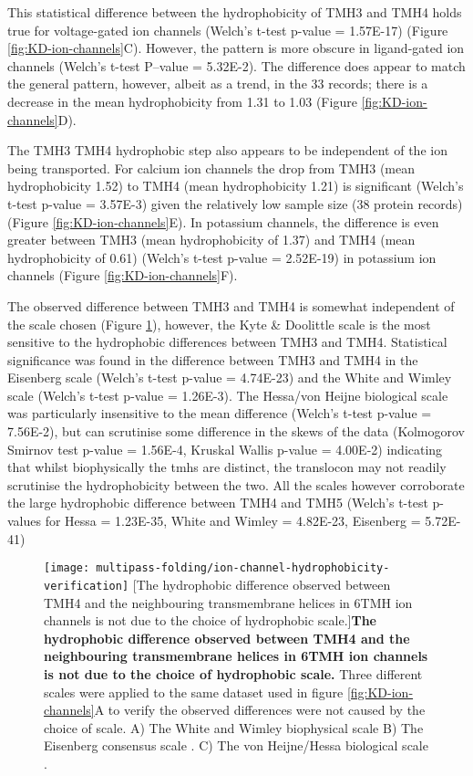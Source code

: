 This statistical difference between the hydrophobicity of TMH3 and TMH4 holds true for voltage\--gated ion channels (Welch's t\--test p\--value = 1.57E-17) (Figure \ref{fig:KD-ion-channels}C).
However, the pattern is more obscure in ligand\--gated ion channels (Welch's t\--test P\---value = 5.32E-2).
The difference does appear to match the general pattern, however, albeit as a trend, in the 33 records; there is a decrease in the mean hydrophobicity from 1.31 to 1.03 (Figure \ref{fig:KD-ion-channels}D).

 The TMH3 TMH4 hydrophobic step also appears to be independent of the ion being transported.
 For calcium ion channels the drop from TMH3 (mean hydrophobicity 1.52) to TMH4 (mean hydrophobicity 1.21) is significant (Welch's t\--test p\--value = 3.57E-3) given the relatively low sample size (38 protein records) (Figure \ref{fig:KD-ion-channels}E).
In potassium channels, the difference is even greater between TMH3 (mean hydrophobicity of 1.37) and TMH4 (mean hydrophobicity of 0.61) (Welch's t\--test p\--value = 2.52E-19) in potassium ion channels (Figure \ref{fig:KD-ion-channels}F).

The observed difference between TMH3 and TMH4 is somewhat independent of the scale chosen (Figure \ref{fig:ion-channel-hydrophobicity-verification}), however, the Kyte \& Doolittle scale is the most sensitive to the hydrophobic differences between TMH3 and TMH4.
Statistical significance was found in the difference between TMH3 and TMH4 in the Eisenberg scale (Welch's t\--test p\--value = 4.74E-23) and the White and Wimley scale (Welch's t\--test p\--value = 1.26E-3).
The Hessa/von Heijne biological scale was particularly insensitive to the mean difference (Welch's t\--test p\--value = 7.56E-2), but can scrutinise some difference in the skews of the data (Kolmogorov Smirnov test  p\--value = 1.56E-4, Kruskal Wallis p\--value = 4.00E-2) indicating that whilst biophysically the \gls{tmh}s are distinct, the translocon may not readily scrutinise the hydrophobicity between the two.
All the scales however corroborate the large hydrophobic difference between TMH4 and TMH5 (Welch's t\--test p\--values for Hessa = 1.23E-35, White and Wimley = 4.82E-23, Eisenberg = 5.72E-41)

\begin{figure}[!ht]
\centering
\texttt{[image: multipass-folding/ion-channel-hydrophobicity-verification]}
  [The hydrophobic difference observed between TMH4 and the neighbouring transmembrane helices in 6TMH ion channels is not due to the choice of hydrophobic scale.]{\textbf{The hydrophobic difference observed between TMH4 and the neighbouring transmembrane helices in 6TMH ion channels is not due to the choice of hydrophobic scale.}
  Three different scales were applied to the same dataset used in figure \ref{fig:KD-ion-channels}A to verify the observed differences were not caused by the choice of scale.
  A) The White and Wimley biophysical scale \cite{White1999}
  B) The Eisenberg consensus scale \cite{Eisenberg1984}.
  C) The von Heijne/Hessa biological scale \cite{Hessa2005}.}

\label{fig:ion-channel-hydrophobicity-verification}
\end{figure}

